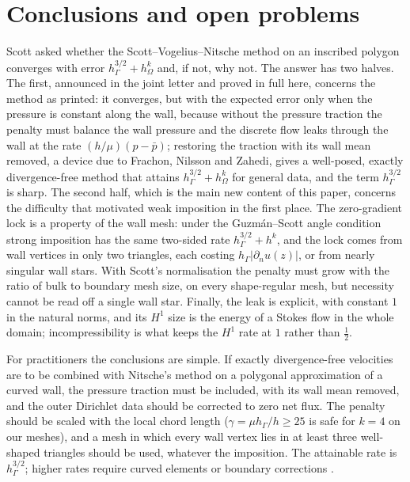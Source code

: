 \documentclass[pdflatex,sn-mathphys-num]{sn-jnl}
\theoremstyle{thmstyleone}
\theoremstyle{thmstylethree}
\newcommand{\hG}{h_\Gamma}
\newcommand{\hO}{h_\Omega}
\newcommand{\dn}{\partial_n}
\newcommand{\pbar}{\bar p}
\begin{document}
\section{Conclusions and open problems}\label{sec:conclusions}

Scott asked whether the Scott--Vogelius--Nitsche method on an inscribed polygon converges with error $\hG^{3/2}+\hO^k$ and, if not, why not. The answer has two halves. The first, announced in the joint letter \cite{CavalcantePadhiLetter} and proved in full here, concerns the method as printed: it converges, but with the expected error only when the pressure is constant along the wall, because without the pressure traction the penalty must balance the wall pressure and the discrete flow leaks through the wall at the rate $(h/\mu)(p-\pbar)$; restoring the traction with its wall mean removed, a device due to Frachon, Nilsson and Zahedi, gives a well-posed, exactly divergence-free method that attains $\hG^{3/2}+\hO^k$ for general data, and the term $\hG^{3/2}$ is sharp. The second half, which is the main new content of this paper, concerns the difficulty that motivated weak imposition in the first place. The zero-gradient lock is a property of the wall mesh: under the Guzm\'an--Scott angle condition strong imposition has the same two-sided rate $\hG^{3/2}+h^k$, and the lock comes from wall vertices in only two triangles, each costing $\hG|\dn u(z)|$, or from nearly singular wall stars. With Scott's normalisation the penalty must grow with the ratio of bulk to boundary mesh size, on every shape-regular mesh, but necessity cannot be read off a single wall star. Finally, the leak is explicit, with constant $1$ in the natural norms, and its $H^1$ size is the energy of a Stokes flow in the whole domain; incompressibility is what keeps the $H^1$ rate at $1$ rather than $\frac12$.

For practitioners the conclusions are simple. If exactly divergence-free velocities are to be combined with Nitsche's method on a polygonal approximation of a curved wall, the pressure traction must be included, with its wall mean removed, and the outer Dirichlet data should be corrected to zero net flux. The penalty should be scaled with the local chord length ($\gamma=\mu\hG/h\ge25$ is safe for $k=4$ on our meshes), and a mesh in which every wall vertex lies in at least three well-shaped triangles should be used, whatever the imposition. The attainable rate is $\hG^{3/2}$; higher rates require curved elements or boundary corrections \cite{NeilanOtus2021,DurstNeilan2024,LiuNeilanOtus2023,ChenLiu2026}.
\end{document}
